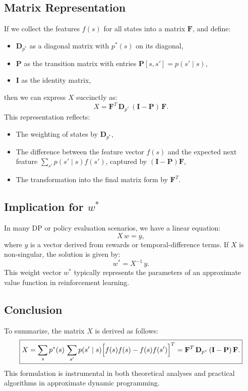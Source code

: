 \subsection{Matrix Representation}
If we collect the features $f(s)$ for all states into a matrix $\mathbf{F}$, and define:
\begin{itemize}
    \item $\mathbf{D}_{p^*}$ as a diagonal matrix with $p^*(s)$ on its diagonal,
    \item $\mathbf{P}$ as the transition matrix with entries $\mathbf{P}[s,s'] = p(s' \mid s)$,
    \item $\mathbf{I}$ as the identity matrix,
\end{itemize}
then we can express $X$ succinctly as:
\[
X = \mathbf{F}^T\,\mathbf{D}_{p^*}\,(\mathbf{I} - \mathbf{P})\,\mathbf{F}.
\]
This representation reflects:
\begin{itemize}
    \item The weighting of states by $\mathbf{D}_{p^*}$,
    \item The difference between the feature vector $f(s)$ and the expected next feature $\sum_{s'} p(s' \mid s) f(s')$, captured by $(\mathbf{I} - \mathbf{P})\mathbf{F}$,
    \item The transformation into the final matrix form by $\mathbf{F}^T$.
\end{itemize}

\subsection{Implication for $w^*$}
In many DP or policy evaluation scenarios, we have a linear equation:
\[
X\,w = y,
\]
where $y$ is a vector derived from rewards or temporal-difference terms. If $X$ is non-singular, the solution is given by:
\[
w^* = X^{-1}\,y.
\]
This weight vector $w^*$ typically represents the parameters of an approximate value function in reinforcement learning.

\subsection{Conclusion}
To summarize, the matrix $X$ is derived as follows:
\[
\boxed{
X = \sum_{s} p^*(s)\,\sum_{s'} p(s' \mid s)
\Bigl[f(s)f(s) - f(s)f(s')\Bigr]^T
= \mathbf{F}^T\,\mathbf{D}_{p^*}\,(\mathbf{I} - \mathbf{P})\,\mathbf{F}.
}
\]
This formulation is instrumental in both theoretical analyses and practical algorithms in approximate dynamic programming.
